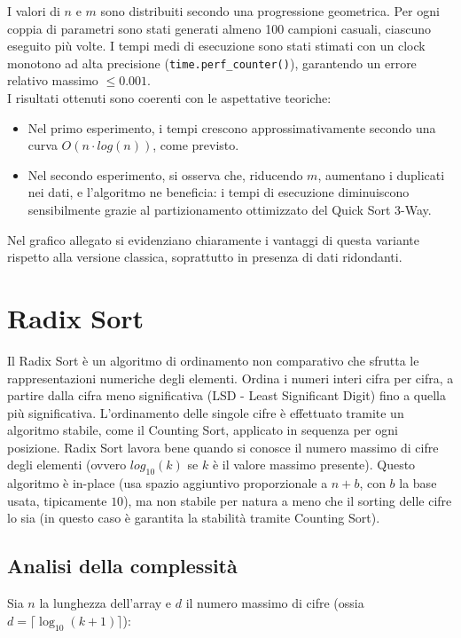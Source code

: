 \documentclass[a4paper, 12pt, oneside]{book}
\begin{document}
I valori di \(n\) e \(m\) sono distribuiti secondo una progressione geometrica. Per ogni coppia di parametri sono stati generati almeno 100 campioni casuali, ciascuno eseguito più volte. I tempi medi di esecuzione sono stati stimati con un clock monotono ad alta precisione (\texttt{time.perf\_counter()}), garantendo un errore relativo massimo \(\leq 0.001\). \\

\noindent I risultati ottenuti sono coerenti con le aspettative teoriche:

\begin{itemize}
    \item Nel primo esperimento, i tempi crescono approssimativamente secondo una curva \(O(n \cdot log(n))\), come previsto.
    \item Nel secondo esperimento, si osserva che, riducendo \(m\), aumentano i duplicati nei dati, e l'algoritmo ne beneficia: i tempi di esecuzione diminuiscono sensibilmente grazie al partizionamento ottimizzato del Quick Sort 3-Way.
\end{itemize}

\noindent Nel grafico allegato si evidenziano chiaramente i vantaggi di questa variante rispetto alla versione classica, soprattutto in presenza di dati ridondanti.


\chapter{Radix Sort}\label{chap:Radix Sort} %

Il Radix Sort è un algoritmo di ordinamento non comparativo che sfrutta le rappresentazioni numeriche degli elementi. Ordina i numeri interi cifra per cifra, a partire dalla cifra meno significativa (LSD - Least Significant Digit) fino a quella più significativa. L'ordinamento delle singole cifre è effettuato tramite un algoritmo stabile, come il Counting Sort, applicato in sequenza per ogni posizione.
Radix Sort lavora bene quando si conosce il numero massimo di cifre degli elementi (ovvero \(log_{10}(k)\) se \(k\) è il valore massimo presente).
Questo algoritmo è in-place (usa spazio aggiuntivo proporzionale a \(n + b\), con \(b\) la base usata, tipicamente \(10\)), ma non stabile per natura a meno che il sorting delle cifre lo sia (in questo caso è garantita la stabilità tramite Counting Sort).

\section{Analisi della complessità}
Sia \(n\) la lunghezza dell'array e \(d\) il numero massimo di cifre (ossia \( d = \lceil \log_{10}(k + 1) \rceil \)): \\
\end{document}
